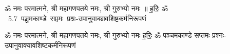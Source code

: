 \documentclass[17pt]{extarticle}
\begin{document}
\begin{titlepage}
    \begin{center}
 
\begin{sanskrit}
    { \Large
    ॐ नमः परमात्मने, श्री महागणपतये नमः, श्री गुरुभ्यो नमः ॥ ह॒रिः॒ ॐ 
    }
    \\
    \vspace{2.5cm}
    \mbox{ \Huge
    5.7      पञ्चमकाण्डे सप्तमः प्रश्नः-उपानुवाक्यावशिष्टकर्मनिरूपणं   }
\end{sanskrit}
\end{center}

\end{titlepage}
\tableofcontents

ॐ नमः परमात्मने, श्री महागणपतये नमः, श्री गुरुभ्यो नमः
ह॒रिः॒ ॐ       पञ्चमकाण्डे सप्तमः प्रश्नः-उपानुवाक्यावशिष्टकर्मनिरूपणं \newline

\end{document}
